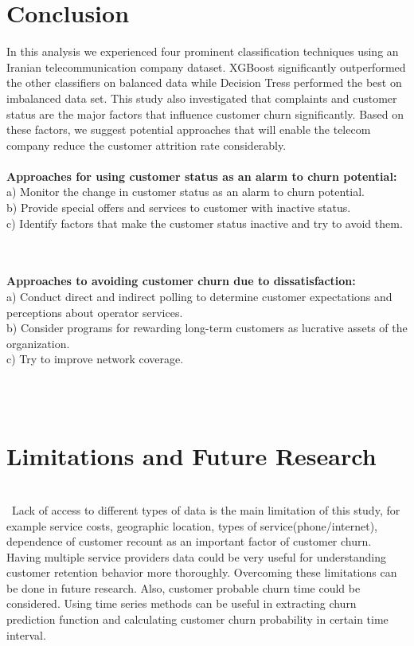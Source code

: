 \documentclass[a4paper, 10pt, conference]{ieeeconf}      %
\begin{document}
\section{\textbf{Conclusion}}
In this analysis we experienced four prominent classification techniques using an Iranian telecommunication company dataset. XGBoost significantly outperformed the other classifiers on balanced data while Decision Tress performed the best on imbalanced data set. This study also investigated that complaints and customer status are the major factors that influence customer churn significantly. Based on these factors, we suggest potential approaches that will enable the telecom company reduce the customer attrition rate considerably.
\\\
\\\textbf{Approaches for using customer status as an alarm to churn potential:}
\\a) Monitor the change in customer status as an alarm to churn potential.
\\b) Provide special offers and services to customer with inactive status.
\\c) Identify factors that make the customer status inactive and try to avoid them.

\\\
\\\textbf{Approaches to avoiding customer churn due to dissatisfaction:}
\\a) Conduct direct and indirect polling to determine customer expectations and perceptions about operator services.
\\b) Consider programs for rewarding long-term customers as lucrative assets of the organization.
\\c) Try to improve network coverage.

\\\
\section{\textbf{Limitations and Future Research}}
\\\
Lack of access to different types of data is the main limitation of this study, for example service costs, geographic location, types of service(phone/internet), dependence of customer recount as an important factor of customer churn.  Having multiple service providers data could be very useful for understanding customer retention behavior more thoroughly.  Overcoming these limitations can be done in future research.  Also, customer probable churn time could be considered. Using time series methods can be useful in extracting churn prediction function and calculating customer churn probability in certain time interval.
\end{document}
